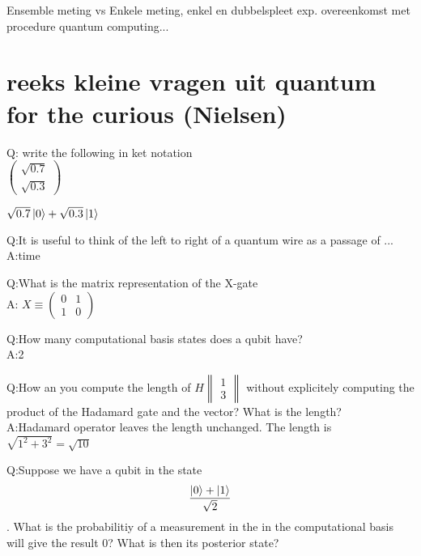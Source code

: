 \documentclass[a4paper, addpoints, 12pt
    , answers    %
    ]{exam}
\begin{document}
\begin{questions}

\question[]
Ensemble meting vs Enkele meting, enkel en dubbelspleet exp. overeenkomst met procedure quantum computing...

\section*{reeks kleine vragen uit quantum for the curious (Nielsen)}
Q: write the following in ket notation\\
$\begin{pmatrix}
\sqrt{0.7}\\
\sqrt{0.3}
\end{pmatrix}
$

$\sqrt{0.7} \ket{0}+\sqrt{0.3}\ket{1}$


Q:It is useful to think of the left to right of a quantum wire as a passage of ...
\\
A:time

Q:What is the matrix representation of the X-gate\\
A:
$X \equiv \begin{pmatrix}
0&1\\
1&0
\end{pmatrix}
$

Q:How many computational basis states does a qubit have?\\
A:2

Q:How an you compute the length of
$H\begin{Vmatrix}
1\\
3
\end{Vmatrix}
$
without explicitely computing the product of the Hadamard gate and the vector?
What is the length?\\

A:Hadamard operator leaves the length unchanged. The length is $\sqrt{1^2+3^2}=\sqrt{10}$

Q:Suppose we have a qubit in the state
$$\frac{\ket{0}+\ket{1}}{\sqrt{2}}$$. What is the probabilitiy of a measurement in the in the computational basis will give the result 0? What is then its posterior state? 


\end{questions}
\end{document}
